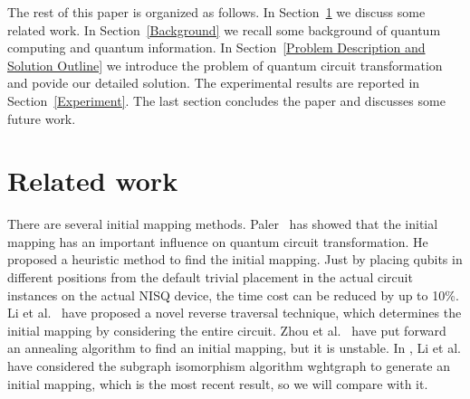 \documentclass[journal]{IEEEtran}
\begin{document}
	The rest of this paper is organized as follows.
	In Section~\ref{Related work} we discuss some related work. In Section~\ref{Background}
	we recall some background of quantum computing and quantum information. In Section~\ref{Problem Description and Solution Outline} 
	we introduce the problem of  quantum circuit transformation and povide our detailed solution.
	The experimental results are reported in Section~\ref{Experiment}. 
	The last section concludes the paper and discusses some future work.
	
	
	\section{Related work}
	\label{Related work}
	There are several initial mapping methods. Paler~\cite{Paler2018} has showed that the initial mapping has an important influence on quantum circuit transformation. He proposed a heuristic method to find the initial mapping. Just by placing qubits in different positions from the default trivial placement
	in the actual circuit instances on the actual NISQ device, the time cost can be reduced by up to 10\%. Li et al.~\cite{Li2018} have proposed a novel reverse traversal technique, which determines the initial mapping by considering the entire circuit. Zhou et al.~\cite{Xiangzhen2020} have put forward an annealing algorithm to find an initial mapping, but it is unstable. In \cite{2020Qubit}, Li et al. have considered the subgraph isomorphism algorithm wghtgraph to generate an initial mapping, which is the most recent result, so we will compare with it.
	
\end{document}
